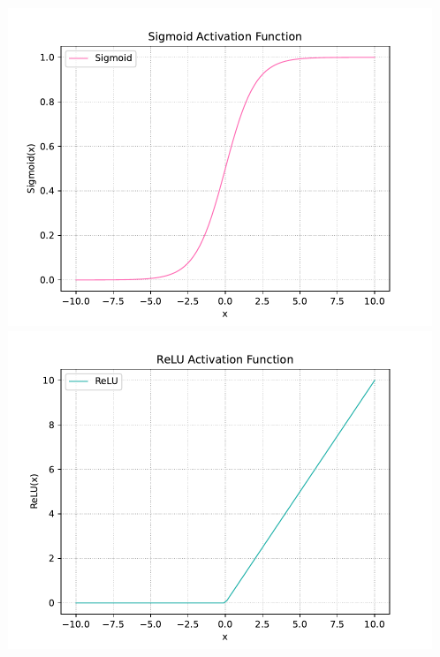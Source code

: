 \begin{figure}[h]
    \centering
    \begin{minipage}[b]{0.3\textwidth}
        \centering
        \includegraphics[width=1.2\linewidth]{Images/5.SPANet/Sigmoid.pdf} 
    \end{minipage}
     \hspace{0.01\textwidth}
    \begin{minipage}[b]{0.3\textwidth}
        \centering
        \includegraphics[width=1.2\linewidth]{Images/5.SPANet/ReLU.pdf} 
    \end{minipage}
     \hspace{0.01\textwidth}
    \begin{minipage}[b]{0.3\textwidth}

\end{minipage}
\end{figure}
